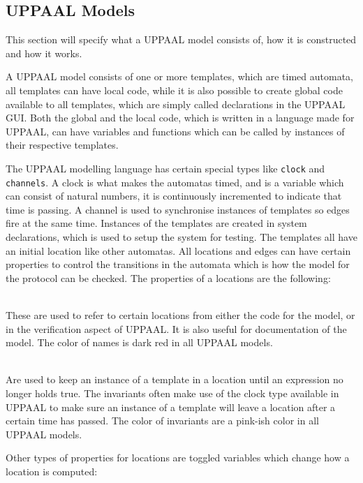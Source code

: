 \subsection{UPPAAL Models}\label{UPPAAL_Models}
This section will specify what a UPPAAL model consists of, how it is constructed and how it works.

\bigskip\noindent%
A UPPAAL model consists of one or more templates, which are timed automata, all templates can have local code, while it is also possible to create global code available to all templates, which are simply called declarations in the UPPAAL GUI.
Both the global and the local code, which is written in a language made for UPPAAL, can have variables and functions which can be called by instances of their respective templates.

The UPPAAL modelling language has certain special types like \texttt{clock} and \texttt{channels}.
A clock is what makes the automatas timed, and is a variable which can consist of natural numbers, it is continuously incremented to indicate that time is passing.
A channel is used to synchronise instances of templates so edges fire at the same time.
Instances of the templates are created in system declarations, which is used to setup the system for testing.
The templates all have an initial location like other automatas.
All locations and edges can have certain properties to control the transitions in the automata which is how the model for the protocol can be checked.
The properties of a locations are the following: 

\begin{description}[labelindent=\parindent]
    \item[Name]\hfill\\
    These are used to refer to certain locations from either the code for the model, or in the verification aspect of UPPAAL. It is also useful for documentation of the model. The color of names is dark red in all UPPAAL models.
    \item[Invariants]\hfill\\
    Are used to keep an instance of a template in a location until an expression no longer holds true. The invariants often make use of the clock type available in UPPAAL to make sure an instance of a template will leave a location after a certain time has passed. The color of invariants are a pink-ish color in all UPPAAL models.
\end{description}

\noindent
Other types of properties for locations are toggled variables which change how a location is computed:

